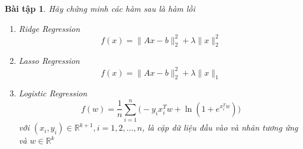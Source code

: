 \documentclass[14pt, a4paper]{article}
\theoremstyle{sltheorem}
\newtheorem{baitap}{Bài tập}
\theoremstyle{soltheorem}
\begin{document}
    \nocite{*}

    \begin{baitap}
        Hãy chứng minh các hàm sau là hàm lồi

        \begin{enumerate}[wide, labelwidth=!, labelindent=0pt,label=\textbf{\arabic*}.]
            \item Ridge Regression
            \begin{equation*}
                f(x)=\lVert Ax - b \rVert_2^2 + \lambda \lVert x \rVert_2^2
            \end{equation*}
            \item Lasso Regression
            \begin{equation*}
                f(x)=\lVert Ax - b \rVert_2^2 + \lambda \lVert x \rVert_1
            \end{equation*}
            \item Logistic Regression
            \begin{equation*}
                f(w)=\dfrac{1}{n}\sum_{i=1}^n \Big( -y_i x_i^T w + \ln(1 + e^{x_i^T w}) \Big)
            \end{equation*}
            với $(x_i, y_i) \in \mathbb{R}^{k+1},i=1,2,\dots,n$, là cặp dữ liệu đầu vào và nhãn tương ứng và $w \in \mathbb{R}^k$
        \end{enumerate}
    \end{baitap}
\end{document}
